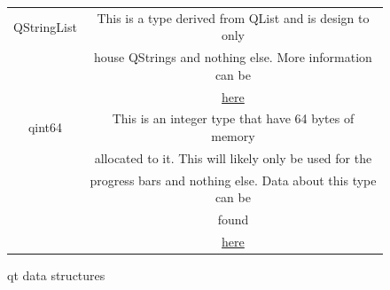 \documentclass{article}
\begin{document}
\begin{figure}[H]
\begin{center}
\begin{tabular} {| c | c |}
            QStringList          &This is a type derived from QList and is design to only    \\
                                 &house QStrings and nothing else. More information can be   \\
                                 &\href{http://doc.qt.io/qt-5/qstringlist.html}{here}        \\ \hline
            qint64               &This is an integer type that have 64 bytes of memory      \\
                                 &allocated to it. This will likely only be used for the     \\
                                 &progress bars and nothing else. Data about this type can be\\
                                 &found                                                      \\
                                 &\href{https://doc.qt.io/qt-5/qtglobal.html#qint64-typedef}{here} \\ \hline
        \end{tabular}
    \end{center}
    \caption{qt data structures} \label{fig:qtDataStructs}
\end{figure}
\end{document}
